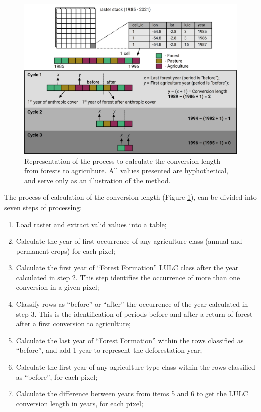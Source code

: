 \documentclass[essd, manuscript]{copernicus}
\begin{document}
\begin{figure}[h]
\includegraphics[width=17cm]{figs/change_lenght_routine_scheme} \caption{Representation of the process to calculate the conversion length from forests to agriculture. All values presented are hyphothetical, and serve only as an illustration of the method.}\label{fig:routine-plot}
\end{figure}

The process of calculation of the conversion length (Figure \ref{fig:routine-plot}), can be divided into seven steps of processing:

\begin{enumerate}
\def\labelenumi{\arabic{enumi}.}
\item
  Load raster and extract valid values into a table;
\item
  Calculate the year of first occurrence of any agriculture class (annual and permanent crops) for each pixel;
\item
  Calculate the first year of ``Forest Formation'' LULC class after the year calculated in step 2.
  This step identifies the occurrence of more than one conversion in a given pixel;
\item
  Classify rows as ``before'' or ``after'' the occurrence of the year calculated in step 3.
  This is the identification of periods before and after a return of forest after a first conversion to agriculture;
\item
  Calculate the last year of ``Forest Formation'' within the rows classified as ``before'', and add 1 year to represent the deforestation year;
\item
  Calculate the first year of any agriculture type class within the rows classified as ``before'', for each pixel;
\item
  Calculate the difference between years from items 5 and 6 to get the LULC conversion length in years, for each pixel;
\end{enumerate}
\end{document}
